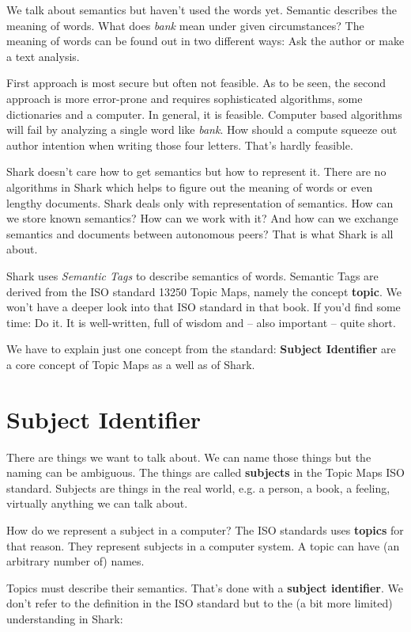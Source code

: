 We talk about semantics but haven't used the words yet. Semantic describes the meaning of words. What does {\it bank} mean under given circumstances? The meaning of words can be found out in two different ways: Ask the author or make a text analysis.

First approach is most secure but often not feasible. As to be seen, the second approach is more error-prone and requires sophisticated algorithms, some dictionaries and a computer. In general, it is feasible. Computer based algorithms will fail by analyzing a single word like {\it bank}. How should a compute squeeze out author intention when writing those four letters. That's hardly feasible.

Shark doesn't care how to get semantics but how to represent it. There are no algorithms in Shark which helps to figure out the meaning of words or even lengthy documents. Shark deals only with representation of semantics. How can we store known semantics? How can we work with it? And how can we exchange semantics and documents between autonomous peers? That is what Shark is all about.

Shark uses {\it Semantic Tags} to describe semantics of words. Semantic Tags are derived from the ISO standard 13250 Topic Maps, namely the concept {\bf topic}. We won't have a deeper look into that ISO standard in that book. If you'd find some time: Do it. It is well-written, full of wisdom and -- also important -- quite short.

We have to explain just one concept from the standard: {\bf Subject Identifier} are a core concept of Topic Maps as a well as of Shark.

\section{Subject Identifier}
There are things we want to talk about. We can name those things but the naming can be ambiguous. The things are called {\bf subjects} in the Topic Maps ISO standard. Subjects are things in the real world, e.g. a person, a book, a feeling, virtually anything we can talk about.

How do we represent a subject in a computer? The ISO standards uses {\bf topics} for that reason. They represent subjects in a computer system. A topic can have (an arbitrary number of) names.

Topics must describe their semantics. That's done with a {\bf subject identifier}. We don't refer to the definition in the ISO standard but to the (a bit more limited) understanding in Shark:

